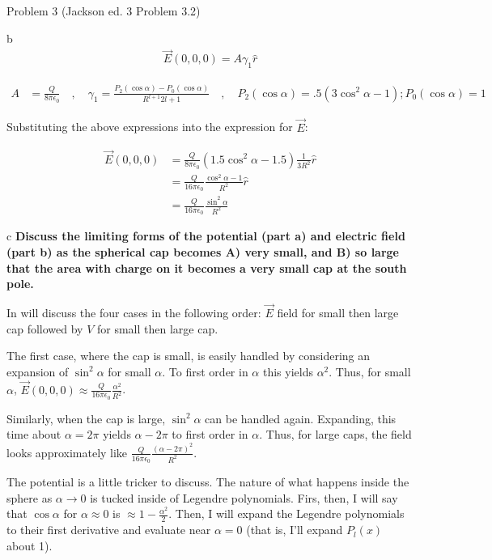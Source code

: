 \begin{homeworkProblem}{Problem 3 (Jackson ed. 3 Problem 3.2)}
\begin{homeworkSection}{b}
\begin{align}
\vec{E}(0,0,0)= A \gamma_1 \hat{r} \nonumber
\end{align}
\begin{center}
\begin{align}
	A &= \frac{Q}{8\pi \epsilon_0} \quad,\quad \gamma_1 = \frac{P_2(\cos\alpha)-P_0(\cos\alpha)}{R^{l+1}2l+1} \quad,\quad P_2(\cos\alpha) = .5(3\cos^2\alpha-1); P_0(\cos\alpha) = 1
\end{align}
\end{center}

Substituting the above expressions into the expression for $\vec{E}$: 
\begin{center}
	\begin{align}
		\vec{E}(0,0,0) &= \frac{Q}{8\pi \epsilon_0} (1.5 \cos^2\alpha - 1.5)\frac{1}{3R^2} \hat{r} \nonumber \\
		&= \frac{Q}{16\pi \epsilon_0} \frac{\cos^2\alpha - 1}{R^2} \hat{r} \nonumber \\
		&= \frac{Q}{16\pi \epsilon_0} \frac{\sin^2\alpha}{R^2} \nonumber
	\end{align}
\end{center}

\end{homeworkSection}

\begin{homeworkSection}{c}
\textbf{Discuss the limiting forms of the potential (part a) and electric field (part b) 
as the spherical cap becomes A) very small, and B) so large that the area with 
charge on it becomes a very small cap at the south pole.}

In will discuss the four cases in the following order: $\vec{E}$ field for small then large cap followed by $V$ for small then large cap.

The first case, where the cap is small, is easily handled by considering an expansion of $\sin^2\alpha$ for small $\alpha$. To first order in $\alpha$ this yields $\alpha^2$. Thus, for small $\alpha$, $\vec{E}(0,0,0) \approx \frac{Q}{16\pi\epsilon_0} \frac{\alpha^2}{R^2}$.

Similarly, when the cap is large, $\sin^2\alpha$ can be handled again. Expanding, this time about $\alpha = 2\pi$ yields $\alpha - 2\pi$ to first order in $\alpha$. Thus, for large caps, the field looks approximately like $\frac{Q}{16\pi\epsilon_0}\frac{(\alpha-2\pi)^2}{R^2}$.

The potential is a little tricker to discuss. The nature of what happens inside the sphere as $\alpha \rightarrow 0$ is tucked inside of Legendre polynomials. Firs, then, I will say that $\cos\alpha$ for $\alpha \approx 0$ is $\approx 1-\frac{\alpha^2}{2}$. Then, I will expand the Legendre polynomials to their first derivative and evaluate near $\alpha = 0$ (that is, I'll expand $P_l(x)$ about 1).


\end{homeworkSection}
\end{homeworkProblem}
